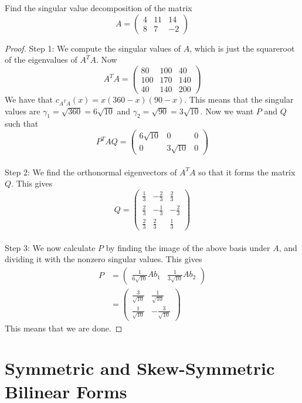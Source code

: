 \documentclass[a4paper]{article}
\begin{document}
\begin{eg}{}{} Find the singular value decomposition of the matrix $$A=\begin{pmatrix}
4 & 11 & 14\\
8 & 7 & -2
\end{pmatrix}$$ 
\begin{proof}
Step 1: We compute the singular values of $A$, which is just the squareroot of the eigenvalues of $A^TA$. Now 
$$A^TA=\begin{pmatrix}
80 & 100 & 40\\
100 & 170 & 140\\
40 & 140 & 200
\end{pmatrix}$$
We have that $c_{A^TA}(x)=x(360-x)(90-x)$. This means that the singular values are $\gamma_1=\sqrt{360}=6\sqrt{10}$ and $\gamma_2=\sqrt{90}=3\sqrt{10}$. Now we want $P$ and $Q$ such that $$P^TAQ=\begin{pmatrix}
6\sqrt{10} & 0 & 0\\
0 & 3\sqrt{10} & 0
\end{pmatrix}$$~\\
Step 2: We find the orthonormal eigenvectors of $A^TA$ so that it forms the matrix $Q$. This gives $$Q=\begin{pmatrix}
\frac{1}{3} & -\frac{2}{3} & \frac{2}{3}\\
\frac{2}{3} & -\frac{1}{3} & -\frac{2}{3}\\
\frac{2}{3} & \frac{2}{3} & \frac{1}{3}
\end{pmatrix}$$~\\
Step 3: We now calculate $P$ by finding the image of the above basis under $A$, and dividing it with the nonzero singular values. This gives 
\begin{align*}
P&=\begin{pmatrix}
\frac{1}{6\sqrt{10}}Ab_1 & \frac{1}{3\sqrt{10}}Ab_2
\end{pmatrix}\\
&=\begin{pmatrix}
\frac{3}{\sqrt{10}} & \frac{1}{\sqrt{10}}\\
\frac{1}{\sqrt{10}} & -\frac{3}{\sqrt{10}}
\end{pmatrix}
\end{align*}
This means that we are done. 
\end{proof}
\end{eg}

\pagebreak
\section{Symmetric and Skew-Symmetric Bilinear Forms}
\end{document}
